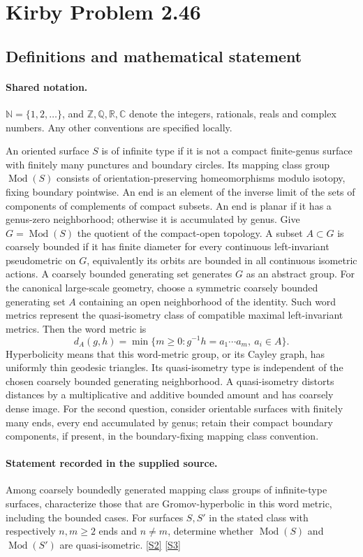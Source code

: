 \documentclass[11pt]{article}
\newcommand{\sref}[2]{\hyperlink{source:#1:#2}{[S#2]}}
\begin{document}
\section{Kirby Problem 2.46}\label{statement}

\subsection{Definitions and mathematical statement}

\paragraph{Shared notation.}$\mathbb N=\{1,2,\ldots\}$, and $\mathbb Z,\mathbb Q,\mathbb R,\mathbb C$ denote the integers, rationals, reals and complex numbers. Any other conventions are specified locally.


An oriented surface $S$ is of infinite type if it is not a compact finite-genus surface with finitely many punctures and boundary circles. Its mapping class group $\operatorname{Mod}(S)$ consists of orientation-preserving homeomorphisms modulo isotopy, fixing boundary pointwise. An end is an element of the inverse limit of the sets of components of complements of compact subsets. An end is planar if it has a genus-zero neighborhood; otherwise it is accumulated by genus. Give $G=\operatorname{Mod}(S)$ the quotient of the compact-open topology. A subset $A\subset G$ is coarsely bounded if it has finite diameter for every continuous left-invariant pseudometric on $G$, equivalently its orbits are bounded in all continuous isometric actions. A coarsely bounded generating set generates $G$ as an abstract group. For the canonical large-scale geometry, choose a symmetric coarsely bounded generating set $A$ containing an open neighborhood of the identity. Such word metrics represent the quasi-isometry class of compatible maximal left-invariant metrics. Then the word metric is
\[d_A(g,h)=\min\{m\ge0:g^{-1}h=a_1\cdots a_m,\ a_i\in A\}.\]
Hyperbolicity means that this word-metric group, or its Cayley graph, has uniformly thin geodesic triangles. Its quasi-isometry type is independent of the chosen coarsely bounded generating neighborhood. A quasi-isometry distorts distances by a multiplicative and additive bounded amount and has coarsely dense image. For the second question, consider orientable surfaces with finitely many ends, every end accumulated by genus; retain their compact boundary components, if present, in the boundary-fixing mapping class convention.
\paragraph{Statement recorded in the supplied source.}
Among coarsely boundedly generated mapping class groups of infinite-type surfaces, characterize those that are Gromov-hyperbolic in this word metric, including the bounded cases. For surfaces $S,S'$ in the stated class with respectively $n,m\ge2$ ends and $n\ne m$, determine whether $\operatorname{Mod}(S)$ and $\operatorname{Mod}(S')$ are quasi-isometric. \sref{statement}{2} \sref{statement}{3}
\end{document}
